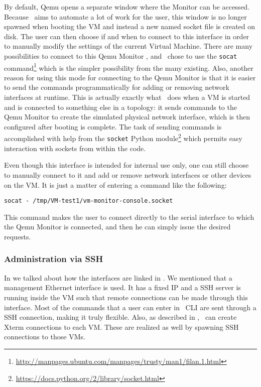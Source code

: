 By default, Qemu opens a separate window where the Monitor can be accessed.
Because \project\ aims to automate a lot of work for the user, this window is no longer spawned when booting the VM and instead a new named socket file is created on disk.
The user can then choose if and when to connect to this interface in order to manually modify the settings of the current Virtual Machine.
There are many possibilities to connect to this Qemu Monitor \cite{qemu-monitor}, and \project\ chose to use the \texttt{socat} command\footnote{\url{http://manpages.ubuntu.com/manpages/trusty/man1/filan.1.html}} which is the simpler possibility from the many existing.
Also, another reason for using this mode for connecting to the Qemu Monitor is that it is easier to send the commands programmatically for adding or removing network interfaces at runtime.
This is actually exactly what \project\ does when a VM is started and is connected to something else in a topology: it sends commands to the Qemu Monitor to create the simulated physical network interface, which is then configured after booting is complete.
The task of sending commands is accomplished with help from the \texttt{socket} Python module\footnote{\url{https://docs.python.org/2/library/socket.html}} which permits easy interaction with sockets from within the code.

Even though this interface is intended for internal use only, one can still choose to manually connect to it and add or remove network interfaces or other devices on the VM.
It is just a matter of entering a command like the following:

\lstset{label=lst:socat-example}
\begin{lstlisting}
socat - /tmp/VM-test1/vm-monitor-console.socket
\end{lstlisting}

This command makes the user to connect directly to the serial interface to which the Qemu Monitor is connected, and then he can simply issue the desired requests.

\subsubsection{Administration via SSH}
\label{sub-sub-sec:admin-SSH}

In  we talked about how the interfaces are linked in \project.
We mentioned that a management Ethernet interface is used.
It has a fixed IP and a SSH server is running inside the VM such that remote connections can be made through this interface.
Most of the commands that a user can enter in \project\ CLI are sent through a SSH connection, making it truly flexible.
Also, as described in , \project\ can create Xterm connections to each VM.
These are realized as well by spawning SSH connections to those VMs.

